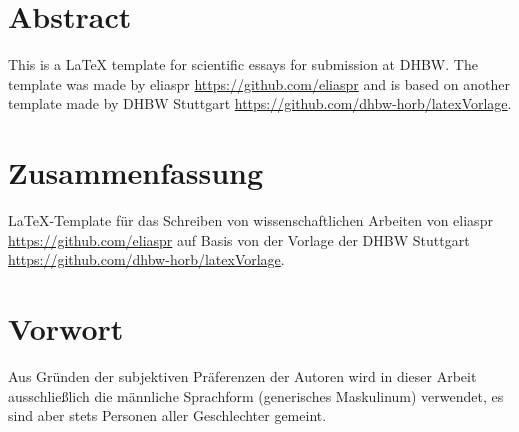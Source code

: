 \pagestyle{empty}

\section*{Abstract}


This is a LaTeX template for scientific essays for submission at DHBW. The template was made by eliaspr \url{https://github.com/eliaspr} and is based on another template made by DHBW Stuttgart \url{https://github.com/dhbw-horb/latexVorlage}.

\newpage
\section*{Zusammenfassung}


LaTeX-Template für das Schreiben von wissenschaftlichen Arbeiten von eliaspr \url{https://github.com/eliaspr} auf Basis von der Vorlage der DHBW Stuttgart \url{https://github.com/dhbw-horb/latexVorlage}.

\newpage
\section*{Vorwort}


Aus Gründen der subjektiven Präferenzen der Autoren wird in dieser Arbeit ausschließlich die männliche Sprachform (generisches Maskulinum) verwendet, es sind aber stets Personen aller Geschlechter gemeint.
